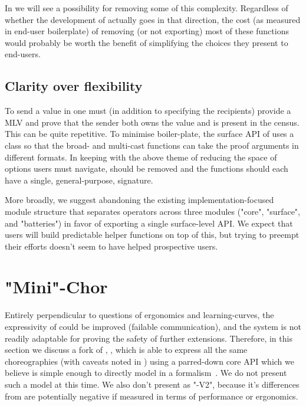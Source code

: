 In  we will see a possibility for removing some of this complexity.
Regardless of whether the development of \MultiChor actually goes in that direction,
the cost (as measured in end-user boilerplate) of removing (or not exporting) most of these functions
would probably be worth the benefit of simplifying the choices they present to end-users.

\subsection{Clarity over flexibility}

To send a value in \MultiChor one must (in addition to specifying the recipients)
provide a MLV and prove that the sender both owns the value and is present in the census.
This can be quite repetitive.
To minimise boiler-plate, the surface API of \MultiChor uses a class 
so that the broad- and multi-cast functions can take the proof arguments in different formats.
In keeping with the above theme of reducing the space of options users must navigate,
 should be removed and the functions should each have a single, general-purpose, signature.

More broadly, we suggest abandoning the existing implementation-focused module structure
that separates operators across three modules ("core", "surface", and "batteries")
in favor of exporting a single surface-level API.
We expect that users will build predictable helper functions on top of this,
but trying to preempt their efforts doesn't seem to have helped prospective users.

\section{"Mini"-Chor}
\label{sec:future-implementation}

Entirely perpendicular to questions of ergonomics and learning-curves, the expressivity of \MultiChor could be improved
(\eg failable communication),
and the \HLSCentral system is not readily adaptable for proving the safety of further extensions.
Therefore, in this section we discuss a fork of \MultiChor, \minichor,
which is able to express all the same choreographies (with caveats noted in )
using a parred-down core API which we believe is simple enough to directly model in a formalism~\cite{minichor-repo}.
We do not present such a model at this time.
We also don't present \minichor as "\MultiChor-V2",
because it's differences from \MultiChor are potentially negative if measured in terms of performance or ergonomics.

